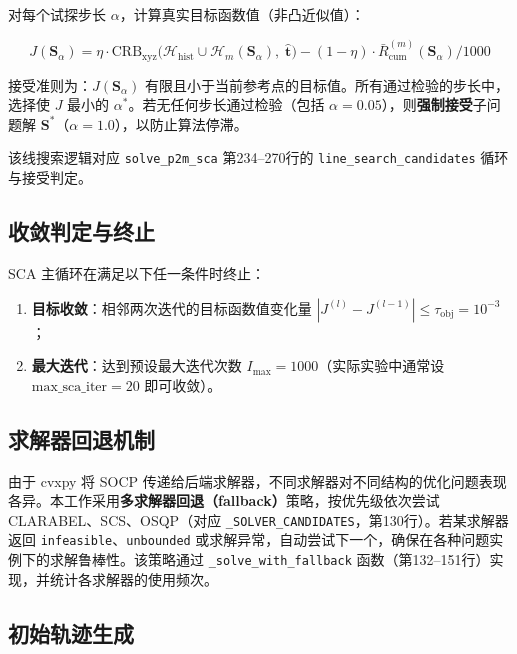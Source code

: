 对每个试探步长 $\alpha$，计算真实目标函数值（非凸近似值）：

\begin{equation}
J(\mathbf{S}_{\alpha})=\eta\cdot\mathrm{CRB}_{\mathrm{xyz}}\bigl(\mathcal{H}_{\mathrm{hist}}\cup\mathcal{H}_m(\mathbf{S}_{\alpha}),\;\hat{\mathbf{t}}\bigr)
-(1-\eta)\cdot\bar{R}_{\mathrm{cum}}^{(m)}(\mathbf{S}_{\alpha})\big/1000
\label{eq:true_objective}
\end{equation}

接受准则为：$J(\mathbf{S}_{\alpha})$ 有限且小于当前参考点的目标值。所有通过检验的步长中，选择使 $J$ 最小的 $\alpha^*$。若无任何步长通过检验（包括 $\alpha=0.05$），则\textbf{强制接受}子问题解 $\mathbf{S}^*$（$\alpha=1.0$），以防止算法停滞。

该线搜索逻辑对应 \texttt{solve\_p2m\_sca} 第234--270行的 \texttt{line\_search\_candidates} 循环与接受判定。

\subsection{收敛判定与终止}

SCA 主循环在满足以下任一条件时终止：

\begin{enumerate}
    \item \textbf{目标收敛}：相邻两次迭代的目标函数值变化量 $|J^{(l)}-J^{(l-1)}|\leq\tau_{\mathrm{obj}}=10^{-3}$；
    \item \textbf{最大迭代}：达到预设最大迭代次数 $I_{\max}=1000$（实际实验中通常设 $\mathrm{max\_sca\_iter}=20$ 即可收敛）。
\end{enumerate}

\subsection{求解器回退机制}

由于 cvxpy 将 SOCP 传递给后端求解器，不同求解器对不同结构的优化问题表现各异。本工作采用\textbf{多求解器回退（fallback）}策略，按优先级依次尝试 CLARABEL、SCS、OSQP（对应 \texttt{\_SOLVER\_CANDIDATES}，第130行）。若某求解器返回 \texttt{infeasible}、\texttt{unbounded} 或求解异常，自动尝试下一个，确保在各种问题实例下的求解鲁棒性。该策略通过 \texttt{\_solve\_with\_fallback} 函数（第132--151行）实现，并统计各求解器的使用频次。

\subsection{初始轨迹生成}

